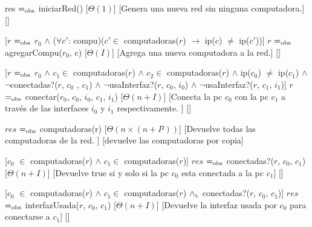\begin{Interfaz}
  

  

  {res $=_{\mathrm{obs}}$ iniciarRed()}%
  [$\Theta(1)$]%
  [Genera una nueva red sin ninguna computadora.]%
  []%
  
  [$r$ $=_{\mathrm{obs}}$ $r_{0}$ $\land$ ($\forall c'$: compu)($c' \in$ computadoras($r$) $\rightarrow$ ip($c$) $\neq$ ip($c'$))]%
  {$r$ $=_{\mathrm{obs}}$ agregarCompu($r_{0}$, c)}%
  [$\Theta(I)$]%
  [Agrega una nueva computadora a la red.]%
  []%

  [$r$ $=_{\mathrm{obs}}$ $r_{0}$ $\land$ $c_{1} \in$ computadoras($r$) $\land$ $c_{2} \in$ computadoras($r$) $\land$ ip($c_{0} $) $\neq$ ip($c_{1}$) $\land$ $\lnot$conectadas?($r$, $c_{0}$ , $c_{1} $) $\land$ $\lnot$usaInterfaz?($r$, $c_{0}$, $i_{0}$) $\land$ $\lnot$usaInterfaz?($r$, $c_{1}$, $i_{1}$)]%
  {$r$ $=_{\mathrm{obs}}$ conectar($r_{0}$, $c_{0}$, $i_{0}$, $c_{1}$, $i_{1}$)}%
  [$\Theta(n+I)$]%
  [Conecta la pc $c_{0}$ con la pc $c_{1}$ a trav\'es de las interfaces $i_{0}$ y $i_{1}$ respectivamente. ]%
  []%
  
  {$res$ $=_{\mathrm{obs}}$ computadoras(r)} %
  [$\Theta(n \times (n+I²))$]%
  [Devuelve todas las computadoras de la red. ]%
  [devuelve las computadoras por copia]%
  
  [$c_{0}$ $\in$ computadoras($r$) $\land$ $c_{1} \in $ computadoras($r$)]%
  {$res$ $=_{\mathrm{obs}}$ conectadas?($r$, $c_{0}$, $c_{1}$)}%
  [$\Theta(n+I)$]%
  [Devuelve true si y solo si la pc $c_{0}$ esta conectada a la pc $c_{1}$]%
  []%
  
  [$c_{0}$ $\in$ computadoras($r$) $\land$ $c_{1} \in $ computadoras($r$) $\land_{\mathrm{\scriptscriptstyle{L}}}$ conectadas?($r$, $c_{0}$, $c_{1}$)]%
  {$res$ $=_{\mathrm{obs}}$ interfazUsada($r$, $c_{0}$, $c_{1}$)}%
  [$\Theta(n+I)$]%
  [Devuelve la interfaz usada por $c_{0}$ para conectarse a $c_{1}$]%
  []%
  

\end{Interfaz}
